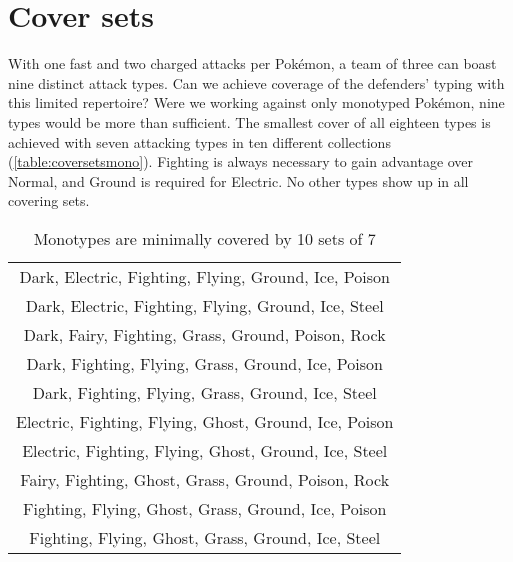 \section{Cover sets\label{sec:coversets}}
With one fast and two charged attacks per Pokémon, a team of three can boast nine distinct attack types.
Can we achieve coverage of the defenders' typing with this limited repertoire?
Were we working against only monotyped Pokémon, nine types would be more than sufficient.
The smallest cover of all eighteen types is achieved with seven attacking types in
  ten different collections (\autoref{table:coversetsmono}).
Fighting is always necessary to gain advantage over Normal, and Ground is required for Electric.
No other types show up in all covering sets.
\begin{table}
  \centering
  \begin{tabular}{c}
 Dark, Electric, Fighting, Flying, Ground, Ice, Poison\\
 Dark, Electric, Fighting, Flying, Ground, Ice, Steel\\
 Dark, Fairy, Fighting, Grass, Ground, Poison, Rock\\
 Dark, Fighting, Flying, Grass, Ground, Ice, Poison\\
 Dark, Fighting, Flying, Grass, Ground, Ice, Steel\\
 Electric, Fighting, Flying, Ghost, Ground, Ice, Poison\\
 Electric, Fighting, Flying, Ghost, Ground, Ice, Steel\\
 Fairy, Fighting, Ghost, Grass, Ground, Poison, Rock\\
 Fighting, Flying, Ghost, Grass, Ground, Ice, Poison\\
 Fighting, Flying, Ghost, Grass, Ground, Ice, Steel\\
  \end{tabular}
  \caption{Monotypes are minimally covered by 10 sets of 7\label{table:coversetsmono}}
\end{table}

